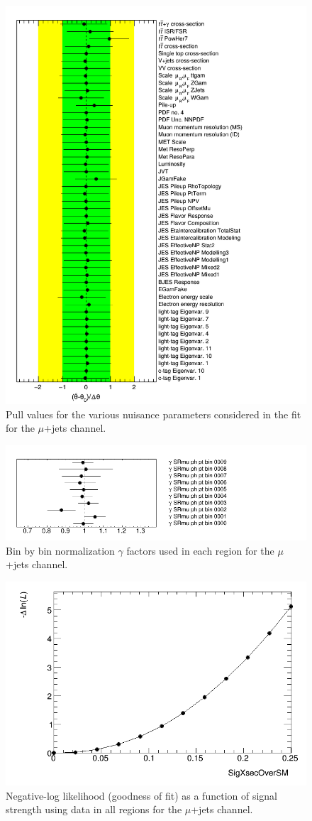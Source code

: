 \begin{figure}[h!]
	\centering
	\includegraphics[width=.5\columnwidth]{../ThesisImages/RegionPlots/FinalRegions/Systematics/MQGamEJetPHptMJet/FCNC_All_mujets/NuisPar.png}
	\caption{Pull values for the various nuisance parameters considered in the fit for the $\mu$+jets channel.}
	\label{fig:NPmujets}
\end{figure}

\begin{figure}[h!]
	\centering
	\includegraphics[width=.5\columnwidth]{../ThesisImages/RegionPlots/FinalRegions/Systematics/MQGamEJetPHptMJet/FCNC_All_mujets/Gammas.png}
	\caption{Bin by bin normalization $\gamma$ factors used in each region for the $\mu$+jets channel.}
	\label{fig:Gammasmujets}
\end{figure}

\begin{figure}[h!]
	\centering
	\includegraphics[width=.5\columnwidth]{../ThesisImages/RegionPlots/FinalRegions/Systematics/MQGamEJetPHptMJet/FCNC_All_mujets/LHoodPlots/NLLscan_SigXsecOverSM.png}
	\caption{Negative-log likelihood (goodness of fit) as a function of signal strength using data in all regions for the $\mu$+jets channel.}
	\label{fig:NLLmujets}
\end{figure}

